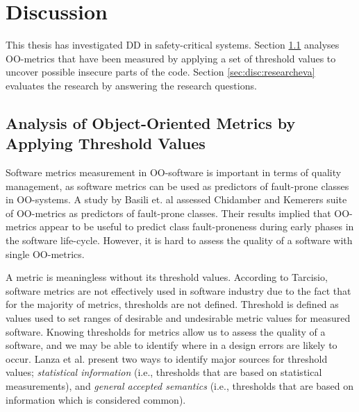 
\chapter{Discussion}
\label{chap:discussion}

This thesis has investigated DD in safety-critical systems. Section \ref{sec:dis-analysis} analyses OO-metrics that have been measured by applying a set of threshold values to uncover possible insecure parts of the code. Section \ref{sec:disc:researcheva} evaluates the research by answering the research questions.


\section{Analysis of Object-Oriented Metrics by Applying Threshold Values}
\label{sec:dis-analysis}
Software metrics measurement in OO-software is important in terms of quality management\cite{tarcisio,ferreira2012identifying}, as software metrics can be used as predictors of fault-prone classes in OO-systems\cite{basili1996validation}. A study by Basili et. al\cite{basili1996validation} assessed Chidamber and Kemerers\cite{chidamber1994metrics} suite of OO-metrics as predictors of fault-prone classes. Their results implied that OO-metrics appear to be useful to predict class fault-proneness during early phases in the software life-cycle. However, it is hard to assess the quality of a software with single OO-metrics. 

A metric is meaningless without its threshold values. According to Tarcisio\cite{tarcisio}, software metrics are not effectively used in software industry due to the fact that for the majority of metrics, thresholds are not defined. Threshold is defined as values used to set ranges of desirable and undesirable metric values for measured software\cite{ferreira2012identifying}. Knowing thresholds for metrics allow us to assess the quality of a software, and we may be able to identify where in a design errors are likely to occur. Lanza et al.\cite{lanza2007object} present two ways to identify major sources for threshold values; \textit{statistical information} (i.e., thresholds that are based on statistical measurements), and \textit{general accepted semantics} (i.e., thresholds that are based on information which is considered common).  

